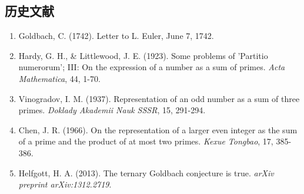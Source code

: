 \subsection{历史文献}

\begin{enumerate}
    \item Goldbach, C. (1742). Letter to L. Euler, June 7, 1742.
    \item Hardy, G. H., \& Littlewood, J. E. (1923). Some problems of 'Partitio numerorum'; III: On the expression of a number as a sum of primes. \textit{Acta Mathematica}, 44, 1-70.
    \item Vinogradov, I. M. (1937). Representation of an odd number as a sum of three primes. \textit{Doklady Akademii Nauk SSSR}, 15, 291-294.
    \item Chen, J. R. (1966). On the representation of a larger even integer as the sum of a prime and the product of at most two primes. \textit{Kexue Tongbao}, 17, 385-386.
    \item Helfgott, H. A. (2013). The ternary Goldbach conjecture is true. \textit{arXiv preprint arXiv:1312.2719}.
\end{enumerate}
